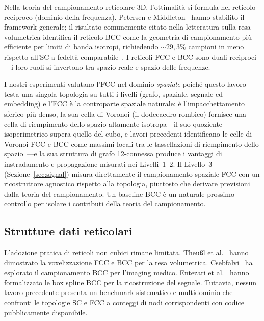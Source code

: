 \documentclass[11pt]{article}
\begin{document}
Nella teoria del campionamento reticolare 3D, l'ottimalit\`a si formula
nel reticolo reciproco (dominio della frequenza). Petersen e
Middleton~\cite{petersen1962} hanno stabilito il framework generale;
il risultato comunemente citato nella letteratura sulla resa volumetrica
identifica il reticolo BCC come la geometria di campionamento pi\`u
efficiente per limiti di banda isotropi, richiedendo ${\sim}29{,}3\%$
campioni in meno rispetto all'SC a fedelt\`a
comparabile~\cite{theussl2002orvs,theussl2001}. I reticoli FCC e BCC
sono duali reciproci---i loro ruoli si invertono tra spazio reale e
spazio delle frequenze.

I nostri esperimenti valutano l'FCC nel dominio \emph{spaziale} poich\'e
questo lavoro testa una singola topologia su tutti i livelli (grafo,
spaziale, segnale ed embedding) e l'FCC \`e la controparte spaziale
naturale: \`e l'impacchettamento sferico pi\`u denso, la sua cella di
Voronoi (il dodecaedro rombico) fornisce una cella di riempimento dello
spazio altamente isotropa---il suo quoziente isoperimetrico supera quello
del cubo, e lavori precedenti identificano le celle di Voronoi FCC e BCC
come massimi locali tra le tassellazioni di riempimento dello
spazio~\cite{conway1999}---e la sua struttura di grafo 12-connessa
produce i vantaggi di instradamento e propagazione misurati nei
Livelli~1--2. Il Livello~3 (Sezione~\ref{sec:signal}) misura direttamente
il campionamento spaziale FCC con un ricostruttore agnostico rispetto
alla topologia, piuttosto che derivare previsioni dalla teoria del
campionamento. Un baseline BCC \`e un naturale prossimo controllo per
isolare i contributi della teoria del campionamento.

\subsection{Strutture dati reticolari}

L'adozione pratica di reticoli non cubici rimane limitata.
Theu{\ss}l et al.~\cite{theussl2001} hanno dimostrato la
voxelizzazione FCC e BCC per la resa volumetrica.
Csebfalvi~\cite{csebfalvi2010} ha esplorato il campionamento BCC per
l'imaging medico. Entezari et al.~\cite{entezari2004} hanno
formalizzato le box spline BCC per la ricostruzione del segnale.
Tuttavia, nessun lavoro precedente presenta un benchmark sistematico e
multidominio che confronti le topologie SC e FCC a conteggi di nodi
corrispondenti con codice pubblicamente disponibile.

\end{document}
